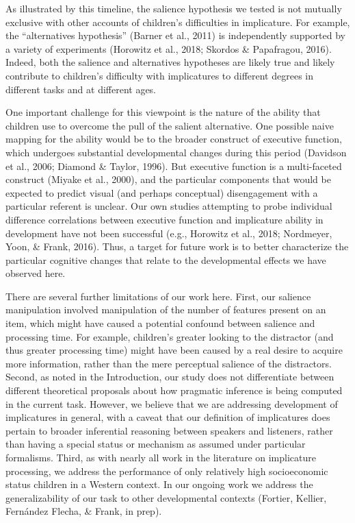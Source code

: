 \documentclass[man]{apa6}
\begin{document}
As illustrated by this timeline, the salience hypothesis we tested is
not mutually exclusive with other accounts of children's difficulties in
implicature. For example, the \enquote{alternatives hypothesis} (Barner
et al., 2011) is independently supported by a variety of experiments
(Horowitz et al., 2018; Skordos \& Papafragou, 2016). Indeed, both the
salience and alternatives hypotheses are likely true and likely
contribute to children's difficulty with implicatures to different
degrees in different tasks and at different ages.

One important challenge for this viewpoint is the nature of the ability
that children use to overcome the pull of the salient alternative. One
possible naive mapping for the ability would be to the broader construct
of executive function, which undergoes substantial developmental changes
during this period (Davidson et al., 2006; Diamond \& Taylor, 1996). But
executive function is a multi-faceted construct (Miyake et al., 2000),
and the particular components that would be expected to predict visual
(and perhaps conceptual) disengagement with a particular referent is
unclear. Our own studies attempting to probe individual difference
correlations between executive function and implicature ability in
development have not been successful (e.g., Horowitz et al., 2018;
Nordmeyer, Yoon, \& Frank, 2016). Thus, a target for future work is to
better characterize the particular cognitive changes that relate to the
developmental effects we have observed here.

There are several further limitations of our work here. First, our
salience manipulation involved manipulation of the number of features
present on an item, which might have caused a potential confound between
salience and processing time. For example, children's greater looking to
the distractor (and thus greater processing time) might have been caused
by a real desire to acquire more information, rather than the mere
perceptual salience of the distractors. Second, as noted in the
Introduction, our study does not differentiate between different
theoretical proposals about how pragmatic inference is being computed in
the current task. However, we believe that we are addressing development
of implicatures in general, with a caveat that our definition of
implicatures does pertain to broader inferential reasoning between
speakers and listeners, rather than having a special status or mechanism
as assumed under particular formalisms. Third, as with nearly all work
in the literature on implicature processing, we address the performance
of only relatively high socioeconomic status children in a Western
context. In our ongoing work we address the generalizability of our task
to other developmental contexts (Fortier, Kellier, Fernández Flecha, \&
Frank, in prep).
\end{document}

